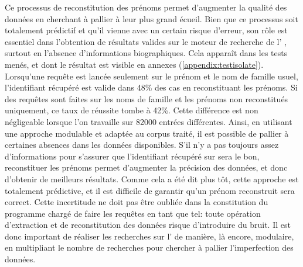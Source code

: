 Ce processus de reconstitution des prénoms permet d'augmenter la qualité des données en cherchant à pallier à leur plus grand écueil. Bien que ce processus soit totalement prédictif et qu'il vienne avec un certain risque d'erreur, son rôle est essentiel dans l'obtention de résultats valides sur le moteur de recherche de l'\api{} \wkd{}, surtout en l'absence d'informations biographiques. Cela apparaît dans les tests menés, et dont le résultat est visible en annexes (\ref{appendix:testisolate}). Lorsqu'une requête est lancée seulement sur le prénom et le nom de famille usuel, l'identifiant \wkd{} récupéré est valide dans 48\% des cas en reconstituant les prénoms. Si des requêtes sont faites sur les noms de famille et les prénoms non reconstitués uniquement, ce taux de réussite tombe à 42\%. Cette différence est non négligeable lorsque l'on travaille sur 82000 entrées différentes. Ainsi, en utilisant une approche modulable et adaptée au corpus traité, il est possible de pallier à certaines absences dans les données disponibles. S'il n'y a pas toujours assez d'informations pour s'assurer que l'identifiant récupéré sur \wkd{} sera le bon, reconstituer les prénoms permet d'augmenter la précision des données, et donc d'obtenir de meilleurs résultats. Comme cela a été dit plus tôt, cette approche est totalement prédictive, et il est difficile de garantir qu'un prénom reconstruit sera correct. Cette incertitude ne doit pas être oubliée dans la constitution du programme chargé de faire les requêtes en tant que tel: toute opération d'extraction et de reconstitution des données risque d'introduire du bruit. Il est donc important de réaliser les recherches sur l'\api{} de manière, là encore, modulaire, en multipliant le nombre de recherches pour chercher à pallier l'imperfection des données.

